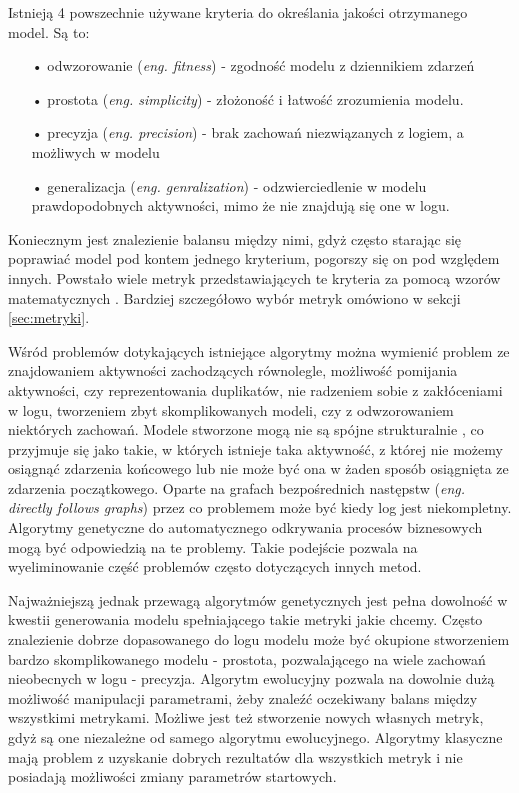 Istnieją 4 powszechnie używane kryteria do określania jakości otrzymanego model. Są to:
\begin{itemize}
  \item[•] odwzorowanie (\textit{eng. fitness}) - zgodność modelu z dziennikiem zdarzeń
  \item[•] prostota (\textit{eng. simplicity}) - złożoność i łatwość zrozumienia modelu.
  \item[•] precyzja (\textit{eng. precision}) - brak zachowań niezwiązanych z logiem, a możliwych w modelu
  \item[•] generalizacja (\textit{eng. genralization}) - odzwierciedlenie w modelu prawdopodobnych aktywności, mimo że nie znajdują się one w logu.
\end{itemize}
Koniecznym jest znalezienie balansu między nimi, gdyż często starając się poprawiać model pod kontem jednego kryterium, pogorszy się on pod względem innych. Powstało wiele metryk przedstawiających te kryteria za pomocą wzorów matematycznych \cite{conf-propositions} \cite{Blum2015MetricsIP}.
Bardziej szczegółowo wybór metryk omówiono w sekcji \ref{sec:metryki}.

Wśród problemów dotykających istniejące algorytmy można wymienić problem ze znajdowaniem aktywności zachodzących równolegle, możliwość pomijania aktywności, czy reprezentowania duplikatów, nie radzeniem sobie z zakłóceniami w logu, tworzeniem zbyt skomplikowanych modeli, czy z odwzorowaniem niektórych zachowań. Modele stworzone mogą nie są spójne strukturalnie \cite{dongen2006b} \cite{StructuralDetectionofDeadlocks}, co przyjmuje się jako takie, w których istnieje taka aktywność, z której nie możemy osiągnąć zdarzenia końcowego lub nie może być ona w żaden sposób osiągnięta ze zdarzenia początkowego. Oparte na grafach bezpośrednich następstw (\textit{eng. directly follows graphs}) przez co problemem może być kiedy log jest niekompletny. Algorytmy genetyczne do automatycznego odkrywania procesów biznesowych mogą być odpowiedzią na te problemy. Takie podejście pozwala na wyeliminowanie część problemów często dotyczących innych metod. 

Najważniejszą jednak przewagą algorytmów genetycznych jest pełna dowolność w kwestii generowania modelu spełniającego takie metryki jakie chcemy. Często znalezienie dobrze dopasowanego do logu modelu może być okupione stworzeniem bardzo skomplikowanego modelu - prostota, pozwalającego na wiele zachowań nieobecnych w logu - precyzja. Algorytm ewolucyjny pozwala na dowolnie dużą możliwość manipulacji parametrami, żeby znaleźć oczekiwany balans między wszystkimi metrykami. Możliwe jest też stworzenie nowych własnych metryk, gdyż są one niezależne od samego algorytmu ewolucyjnego. Algorytmy klasyczne mają problem z uzyskanie dobrych rezultatów dla wszystkich metryk i nie posiadają możliwości zmiany parametrów startowych.

